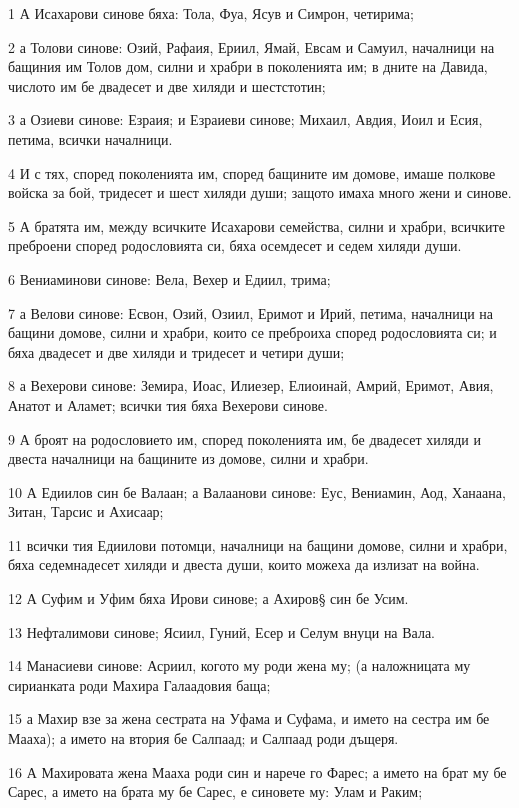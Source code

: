 \par 1 А Исахарови синове бяха: Тола, Фуа, Ясув и Симрон, четирима;
\par 2 а Толови синове: Озий, Рафаия, Ериил, Ямай, Евсам и Самуил, началници на бащиния им Толов дом, силни и храбри в поколенията им; в дните на Давида, числото им бе двадесет и две хиляди и шестстотин;
\par 3 а Озиеви синове: Езраия; и Езраиеви синове; Михаил, Авдия, Иоил и Есия, петима, всички началници.
\par 4 И с тях, според поколенията им, според бащините им домове, имаше полкове войска за бой, тридесет и шест хиляди души; защото имаха много жени и синове.
\par 5 А братята им, между всичките Исахарови семейства, силни и храбри, всичките преброени според родословията си, бяха осемдесет и седем хиляди души.
\par 6 Вениаминови синове: Вела, Вехер и Едиил, трима;
\par 7 а Велови синове: Есвон, Озий, Озиил, Еримот и Ирий, петима, началници на бащини домове, силни и храбри, които се преброиха според родословията си; и бяха двадесет и две хиляди и тридесет и четири души;
\par 8 а Вехерови синове: Земира, Иоас, Илиезер, Елиоинай, Амрий, Еримот, Авия, Анатот и Аламет; всички тия бяха Вехерови синове.
\par 9 А броят на родословието им, според поколенията им, бе двадесет хиляди и двеста началници на бащините из домове, силни и храбри.
\par 10 А Едиилов син бе Валаан; а Валаанови синове: Еус, Вениамин, Аод, Ханаана, Зитан, Тарсис и Ахисаар;
\par 11 всички тия Едиилови потомци, началници на бащини домове, силни и храбри, бяха седемнадесет хиляди и двеста души, които можеха да излизат на война.
\par 12 А Суфим и Уфим бяха Ирови синове; а Ахиров§ син бе Усим.
\par 13 Нефталимови синове; Ясиил, Гуний, Есер и Селум внуци на Вала.
\par 14 Манасиеви синове: Асриил, когото му роди жена му; (а наложницата му сирианката роди Махира Галаадовия баща;
\par 15 а Махир взе за жена сестрата на Уфама и Суфама, и името на сестра им бе Мааха); а името на втория бе Салпаад; и Салпаад роди дъщеря.
\par 16 А Махировата жена Мааха роди син и нарече го Фарес; а името на брат му бе Сарес, а името на брата му бе Сарес, е синовете му: Улам и Раким;
